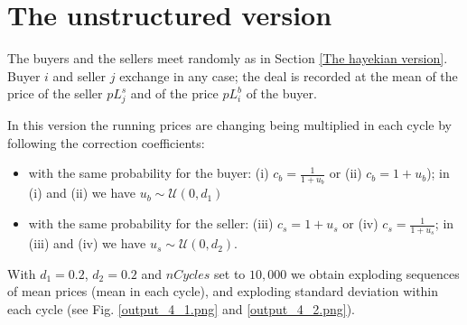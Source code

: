 \documentclass[12pt]{report}
\begin{document}
\section{The unstructured version}\label{The unstructured version}

The buyers and the sellers meet randomly as in Section \ref{The hayekian version}. Buyer $i$ and seller $j$ exchange in any case; the deal is recorded at the mean of the price of the seller $pL^s_j$ and of the price $pL^b_i$ of the buyer.

In this version the running prices are changing being multiplied in each cycle by following the correction coefficients:

\begin{itemize}

\item with the same probability for the buyer: (i) $c_b=\frac{1} {1 + u_b}$ or (ii) $c_b=1 + u_b$); in (i) and (ii) we have $u_b\sim\mathcal{U}(0,d_1)$

\item  with the same probability for the seller: (iii) $c_s=1 + u_s$ or (iv) $c_s=\frac{1} {1 + u_s}$; in (iii) and (iv) we have $u_s\sim\mathcal{U}(0,d_2)$.
\end{itemize}

With $d_1=0.2$, $d_2=0.2$ and $nCycles$ set to $10,000$ we obtain exploding sequences of mean prices (mean in each cycle), and exploding standard deviation within each cycle (see Fig. \ref{output_4_1.png} and \ref{output_4_2.png}).
\end{document}
